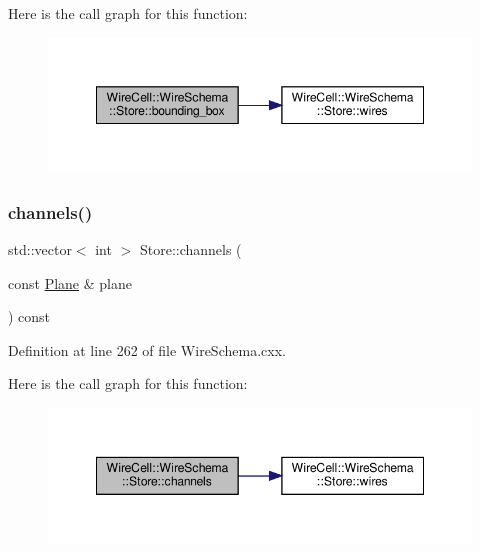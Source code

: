 Here is the call graph for this function\+:
\nopagebreak
\begin{figure}[H]
\begin{center}
\leavevmode
\includegraphics[width=348pt]{class_wire_cell_1_1_wire_schema_1_1_store_a518ea3cec1822b41022594933ccd31b2_cgraph}
\end{center}
\end{figure}
\mbox{\label{class_wire_cell_1_1_wire_schema_1_1_store_a70cdc99b1fa1d6e58359e5d0d7c9ad48}} 
\subsubsection{\texorpdfstring{channels()}{channels()}}
{\footnotesize\ttfamily std\+::vector$<$ int $>$ Store\+::channels (\begin{DoxyParamCaption}\item[{const \hyperlink{struct_wire_cell_1_1_wire_schema_1_1_plane}{Plane} \&}]{plane }\end{DoxyParamCaption}) const}



Definition at line 262 of file Wire\+Schema.\+cxx.

Here is the call graph for this function\+:
\nopagebreak
\begin{figure}[H]
\begin{center}
\leavevmode
\includegraphics[width=348pt]{class_wire_cell_1_1_wire_schema_1_1_store_a70cdc99b1fa1d6e58359e5d0d7c9ad48_cgraph}
\end{center}
\end{figure}
\mbox{\label{class_wire_cell_1_1_wire_schema_1_1_store_aa81035f87804b21da2d018194eed8d85}} 
